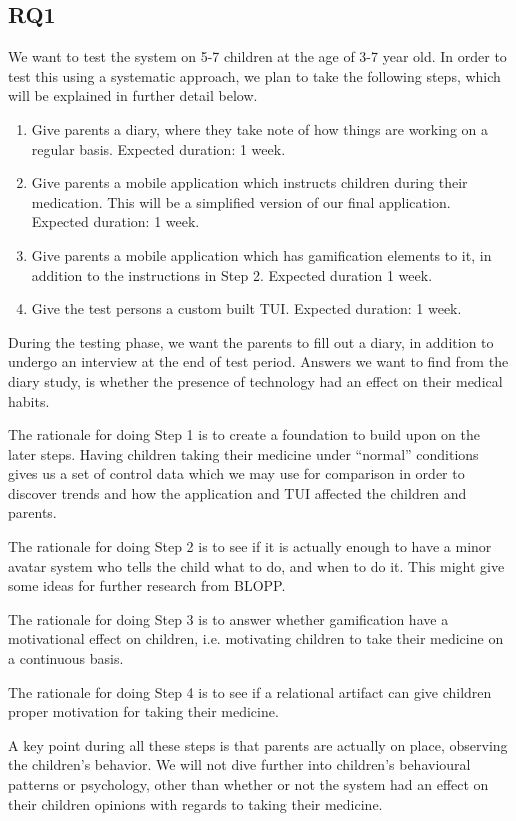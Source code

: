 \subsection{RQ1}
\label{sec:RQ2-methodology}
We want to test the system on 5-7 children at the age of 3-7 year old. In order to test this using a systematic approach, we plan to take the following steps, which will be explained in further detail below. 

\begin{enumerate}
  \item Give parents a diary, where they take note of how things are working on a regular basis. Expected duration: 1 week.
  \item Give parents a mobile application which instructs children during their medication. This will be a simplified version of our final application. Expected duration: 1 week. 
  \item Give parents a mobile application which has gamification elements to it, in addition to the instructions in Step 2. Expected duration 1 week.   
  \item Give the test persons a custom built TUI. Expected duration: 1 week. 
\end{enumerate}
During the testing phase, we want the parents to fill out a diary, in addition to undergo an interview at the end of test period. Answers we want to find from the diary study, is whether the presence of technology had an effect on their medical habits. 

The rationale for doing Step 1 is to create a foundation to build upon on the later steps. Having children taking their medicine under ``normal'' conditions gives us a set of control data which we may use for comparison in order to discover trends and how the application and TUI affected the children and parents. 

The rationale for doing Step 2 is to see if it is actually enough to have a minor avatar system who tells the child what to do, and when to do it. This might give some ideas for further research from BLOPP. 


The rationale for doing Step 3 is to answer whether gamification have a motivational effect on children, i.e. motivating children to take their medicine on a continuous basis. 

The rationale for doing Step 4 is to see if a relational artifact can give children proper motivation for taking their medicine.

A key point during all these steps is that parents are actually on place, observing the children's behavior. We will not dive further into children's behavioural patterns or psychology, other than whether or not the system had an effect on their children opinions with regards to taking their medicine.       
 
